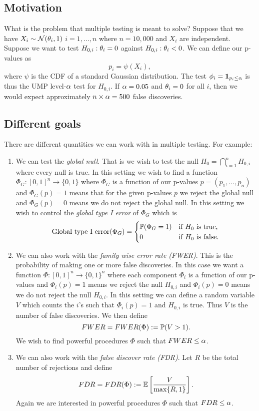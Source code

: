 \subsection{Motivation}
What is the problem that multiple testing is meant to solve? Suppose that we have $X_i \sim {{\mathcal{N}}}({\theta}_i,1)$ $i=1,\ldots,n$ where $n=10,000$ and $X_i$ are independent. Suppose we want to test $H_{0,i} :{\theta}_i=0$ against $H_{0,i}: {\theta}_i <0$. We can define our p-values as 
\[p_i = \psi(X_i), \]
where $\psi$ is the CDF of a standard Gaussian distribution. The test $\phi_i = {{\bf 1}}_{p_i \le {\alpha}}$ is thus the UMP level-${\alpha}$ test for $H_{0,i}$. If ${\alpha} = 0.05$ and ${\theta}_i=0$ for all $i$, then we would expect approximately $n\times {\alpha} = 500$ false discoveries.

\subsection{Different goals}
There are different quantities we can work with in multiple testing. For example:
\begin{enumerate}
    \item We can test the \emph{global null}. That is we wish to test the null $H_0 = \bigcap_{i=1}^n H_{0,i}$ where every null is true. In this setting we wish to find a function $\Phi_G : [0,1]^n \to \{0,1\}$ where $\Phi_G$ is a function of our p-values $p=(p_1,\ldots,p_n)$ and $\Phi_G(p)=1$ means that for the given p-values $p$ we reject the global null and $\Phi_G(p)=0$ means we do not reject the global null. In this setting we wish to control the \emph{global type I error} of $\Phi_G$ which is 
    \[\text{Global type I error}(\Phi_G) = \begin{cases}
        {\mathbb{P}}(\Phi_G=1)&\text{if } H_0 \text{ is true,}\\
        0 & \text{if $H_0$ is false.}
    \end{cases} \]
    \item We can also work with the \emph{family wise error rate (FWER)}. This is the probability of making one or more false discoveries. In this case we want a function $\Phi:[0,1]^n \to \{0,1\}^n$ where each component $\Phi_i$ is a function of our p-values and $\Phi_i(p)=1$ means we reject the null $H_{0,i}$ and $\Phi_i(p)=0$ means we do not reject the null $H_{0,i}$. In this setting we can define a random variable $V$ which counts the $i$'s such that $\Phi_i(p)=1$ and $H_{0,i}$ is true. Thus $V$ is the number of false discoveries. We then define
    \[FWER = FWER(\Phi) := {\mathbb{P}}(V > 1).\]
    We wish to find powerful procedures $\Phi$ such that $FWER \le {\alpha}$. 
    \item We can also work with the \emph{false discover rate (FDR)}. Let $R$ be the total number of rejections and define
    \[FDR =FDR(\Phi) := {\mathbb{E}}\left[\frac{V}{\max\{R,1\}}\right].\]
    Again we are interested in powerful procedures $\Phi$ such that $FDR \le {\alpha}$.
\end{enumerate}
